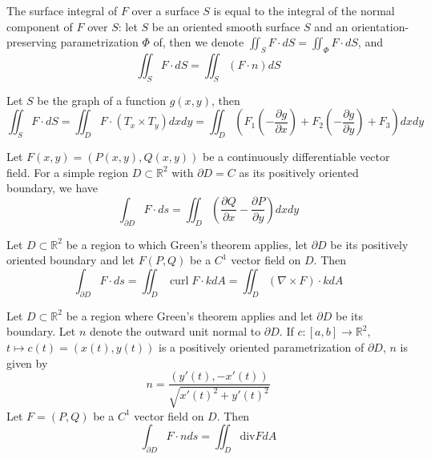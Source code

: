 \documentclass[openany]{book}
\newcommand{\R}{\mathbb{R}}
\newcommand{\curl}{\operatorname{curl}}
\begin{document}
\begin{prop}
    The surface integral of $F$ over a surface $S$ is equal to the integral of the normal component of $F$ over $S$: let $S$ be an oriented smooth surface $S$ and an orientation-preserving parametrization $\Phi$ of, then we denote $\iint_SF\cdot dS=\iint_\Phi F\cdot dS$, and
    \begin{equation*}
        \iint_SF\cdot dS=\iint_S\left(F\cdot n\right)dS
    \end{equation*}
\end{prop}


\begin{prop}
    Let $S$ be the graph of a function $g(x,y)$, then 
    \begin{equation*}
        \iint_SF\cdot dS=\iint_DF\cdot (T_x\times T_y)dxdy=\iint_D\left(F_1\left(-\frac{\partial g}{\partial x}\right)+F_2\left(-\frac{\partial g}{\partial y}\right)+F_3\right)dxdy
    \end{equation*}
\end{prop}

\begin{thm}
    Let $F(x,y)=(P(x,y), Q(x,y))$ be a continuously differentiable vector field. For a simple region $D\subset\R^2$ with $\partial D=C$ as its positively oriented boundary, we have 
    \begin{equation*}
        \int_{\partial D}F\cdot ds=\iint_D\left(\frac{\partial Q}{\partial x}-\frac{\partial P}{\partial y}\right)dxdy
    \end{equation*}
\end{thm}


\begin{thm}
    Let $D\subset\R^2$ be a region to which Green's theorem applies, let $\partial D$ be its positively oriented boundary and let $F(P,Q)$ be a $C^1$ vector field on $D$. Then 
    \begin{equation*}
        \int_{\partial D}F\cdot ds=\iint_D\curl F\cdot k dA=\iint_D(\nabla\times F)\cdot kdA
    \end{equation*}
\end{thm}

\begin{prop}
    Let $D\subset\R^2$ be a region where Green's theorem applies and let $\partial D$ be its boundary. Let $n$ denote the outward unit normal to $\partial D$. If $c:[a,b]\to\R^2$, $t\mapsto c(t)=(x(t), y(t))$ is a positively oriented parametrization of $\partial D$, $n$ is given by 
    \begin{equation*}
        n=\frac{(y'(t), -x'(t))}{\sqrt{x'(t)^2+y'(t)^2}}
    \end{equation*}
    Let $F=(P,Q)$ be a $C^1$ vector field on $D$. Then 
    \begin{equation*}
        \int_{\partial D}F\cdot nds=\iint_D\text{div} FdA
    \end{equation*}
\end{prop}
\end{document}
